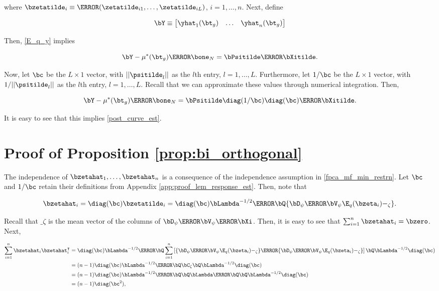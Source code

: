 \documentclass[12pt]{article}
\theoremstyle{plain}
\theoremstyle{definition}
\theoremstyle{remark}
\begin{document}
\noindent where $\bzetatilde_i \equiv \T{(\zetatilde_{i1}, \dots, \zetatilde_{iL})}$, $i = 1, \dots, n$. Next, define

\[
	\bY \equiv \begin{bmatrix} \yhat_1 (\bt_g) & \dots & \yhat_n (\bt_g) \end{bmatrix}
\]

\noindent Then, \eqref{E_q_y} implies

\[
	\bY - \mu^* (\bt_g) \T{\bone_N} = \bPsitilde \T{\bXitilde}.
\]

\noindent Now, let $\bc$ be the $L \times 1$ vector, with $|| \psitilde_l ||$ as the $l$th entry, $l = 1, \dots, L$.
Furthermore, let $1/\bc$ be the $L \times 1$ vector, with $1/|| \psitilde_l ||$ as the $l$th entry, $l = 1, \dots, L$.
Recall that we can approximate these values through numerical integration. Then,

\[
	\bY - \mu^* (\bt_g) \T{\bone_N} = \bPsitilde \diag (1/\bc) \diag (\bc) \T{\bXitilde}.
\]

\noindent It is easy to see that this implies \eqref{post_curve_est}.


\section{Proof of Proposition \ref{prop:bi_orthogonal}}
\label{app:proof_prop_bi_eigenfunctions}

The independence of $\bzetahat_1, \dots, \bzetahat_n$ is a consequence of the independence assumption in
\eqref{fpca_mf_min_restrn}. Let $\bc$ and $1/\bc$ retain their definitions from Appendix
\ref{app:proof_lem_response_est}. Then, note that

\[
	\bzetahat_i
		= \diag (\bc) \bzetatilde_i
		= \diag (\bc) \bLambda^{-1/2} \T{\bQ} \{ \bD_\psi \T{\bV_\psi} \E_q (\bzeta_i) - \bm_\zeta \}.
\]

\noindent Recall that $\bm_\zeta$ is the mean vector of the columns of $\bD_\psi \T{\bV_\psi} \T{\bXi}$.
Then, it is easy to see that $\sum_{i=1}^n \bzetahat_i = \bzero$. Next,

\begin{align*}
	\sum_{i=1}^n \bzetahat_i \bzetahat^{\intercal}_i
		&= \diag (\bc) \bLambda^{-1/2} \T{\bQ}
			\sum_{i=1}^n \left[
				\{ \bD_\psi \T{\bV_\psi} \E_q (\bzeta_i) - \bm_\zeta \}
					\T{\{ \bD_\psi \T{\bV_\psi} \E_q (\bzeta_i) - \bm_\zeta \}}
			\right]
			\bQ \bLambda^{-1/2} \diag (\bc) \\
		&= (n - 1) \diag (\bc) \bLambda^{-1/2} \T{\bQ} \bC_\zeta \bQ \bLambda^{-1/2} \diag (\bc) \\
		&= (n - 1) \diag (\bc) \bLambda^{-1/2} \T{\bQ} \bQ \bLambda \T{\bQ} \bQ \bLambda^{-1/2} \diag (\bc) \\
		&= (n - 1) \diag (\bc^2),
\end{align*}
\end{document}
